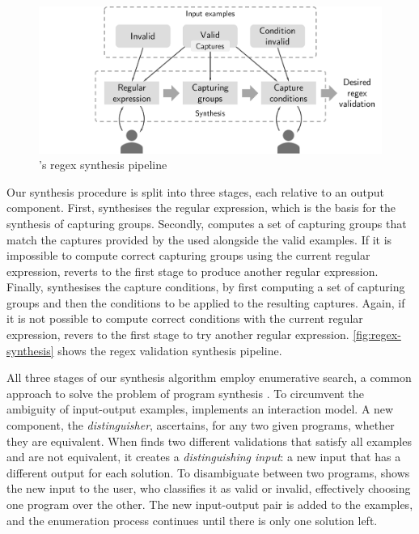 \begin{figure}
    \centering
    \includegraphics[scale=.35]{pictures/regex_synthesis_h.pdf}
    \caption{\Forest's regex synthesis pipeline}
    \label{fig:regex-synthesis}
\end{figure}

Our synthesis procedure is split into three stages, each relative to an output component. %
First, \Forest synthesises the regular expression, which is the basis for the synthesis of capturing groups.
Secondly, \Forest computes a set of capturing groups that match the captures provided by the used alongside the valid examples. If it is impossible to compute correct capturing groups using the current regular expression, \Forest reverts to the first stage to produce another regular expression.
Finally, \Forest synthesises the capture conditions, by first computing a set of capturing groups and then the conditions to be applied to the resulting captures. Again, if it is not possible to compute correct conditions with the current regular expression, \Forest revers to the first stage to try another regular expression.
\autoref{fig:regex-synthesis} shows the regex validation synthesis pipeline.

All three stages of our synthesis algorithm employ enumerative search, a common approach to solve the problem of program synthesis \cite{DBLP:conf/pldi/FengMBD18,DBLP:conf/pldi/FengMGDC17,AlphaRegex16,Orvalho19,DBLP:conf/cav/ReynoldsBNBT19}.
%
To circumvent the ambiguity of input-output examples,
\Forest{} implements an interaction model.
A new component, the \textit{distinguisher}, ascertains, for any two given programs, whether they are equivalent.
When \Forest finds two different validations that satisfy all examples and are not equivalent, it creates a \textit{distinguishing input}: a new input that has a different output for each solution.
%
To disambiguate between two programs,
\Forest shows the new input to the user, who classifies it as valid or invalid, effectively choosing one program over the other.
%
The new input-output pair is added to the examples, and the enumeration process continues until there is only one solution left.


